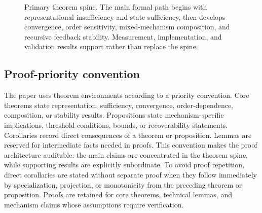 \documentclass[11pt]{article}
\theoremstyle{remark}
\begin{document}
\begin{figure}[htbp]
\centering
{}
\caption{Primary theorem spine. The main formal path begins with representational insufficiency and state sufficiency, then develops convergence, order sensitivity, mixed-mechanism composition, and recursive feedback stability. Measurement, implementation, and validation results support rather than replace the spine.}
\label{fig:theorem-spine}
\end{figure}


\subsection{Proof-priority convention}\label{proof-priority-convention}

The paper uses theorem environments according to a priority convention. Core theorems state representation, sufficiency, convergence, order-dependence, composition, or stability results. Propositions state mechanism-specific implications, threshold conditions, bounds, or recoverability statements. Corollaries record direct consequences of a theorem or proposition. Lemmas are reserved for intermediate facts needed in proofs. This convention makes the proof architecture auditable: the main claims are concentrated in the theorem spine, while supporting results are explicitly subordinate. To avoid proof repetition, direct corollaries are stated without separate proof when they follow immediately by specialization, projection, or monotonicity from the preceding theorem or proposition. Proofs are retained for core theorems, technical lemmas, and mechanism claims whose assumptions require verification.
\end{document}
